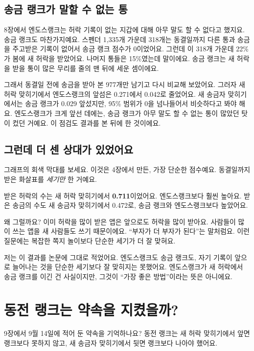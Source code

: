 \subsection*{송금 랭크가 말할 수 없는 통}

8장에서 엔도스랭크는 허락 기록이 없는 지갑에 대해 아무 말도 할 수 없다고 했지요.
송금 랭크도 마찬가지예요.
스펜더 1,335개 가운데 318개는 동결일까지 다른 통과 송금을 주고받은 기록이 없어서 송금 랭크 점수가 0이었어요.
그런데 이 318개 가운데 22\%가 봄에 새 허락을 받았어요.
나머지 통들은 15\%였는데 말이에요.
송금 랭크는 새 허락을 받을 통이 많은 무리를 줄의 맨 뒤에 세운 셈이에요.

그래서 동결일 전에 송금을 받아 본 977개만 남기고 다시 비교해 보았어요.
그러자 새 허락 맞히기에서 엔도스랭크의 앞섬은 0.271에서 0.042로 줄었어요.
새 송금자 맞히기에서는 송금 랭크가 0.029 앞섰지만, 95\% 범위가 0을 넘나들어서 비슷하다고 봐야 해요.
엔도스랭크가 크게 앞선 데에는, 송금 랭크가 아무 말도 할 수 없는 통이 많았던 탓이 컸던 거예요.
이 점검도 결과를 본 뒤에 한 것이에요.

\subsection*{그런데 더 센 상대가 있었어요}

그래프의 회색 막대를 보세요.
이것은 4장에서 만든, 가장 단순한 점수예요.
동결일까지 받은 화살표를 \emph{세기만} 한 거예요.

받은 허락의 수는 새 허락 맞히기에서 \textbf{0.711}이었어요.
엔도스랭크보다 훨씬 높아요.
받은 송금의 수도 새 송금자 맞히기에서 0.472로, 송금 랭크와 엔도스랭크보다 높았어요.

왜 그럴까요?
이미 허락을 많이 받은 앱은 앞으로도 허락을 많이 받아요.
사람들이 많이 쓰는 앱을 새 사람들도 쓰기 때문이에요.
“부자가 더 부자가 된다”는 말처럼요.
이런 질문에는 복잡한 쪽지 놀이보다 단순한 세기가 더 잘 맞혀요.

저는 이 결과를 논문에 그대로 적었어요.
엔도스랭크도 송금 랭크도, 자기 기록이 앞으로 늘어나는 것을 단순한 세기보다 잘 맞히지는 못했어요.
엔도스랭크가 새 허락에서 송금 랭크를 이긴 건 사실이지만, 그것이 “가장 좋은 방법”이라는 뜻은 아니에요.

\section{동전 랭크는 약속을 지켰을까?}

9장에서 9월 14일에 적어 둔 약속을 기억하나요?
동전 랭크는 새 허락 맞히기에서 앞면 랭크보다 못하지 않고, 새 송금자 맞히기에서 뒷면 랭크보다 나아야 했어요.

